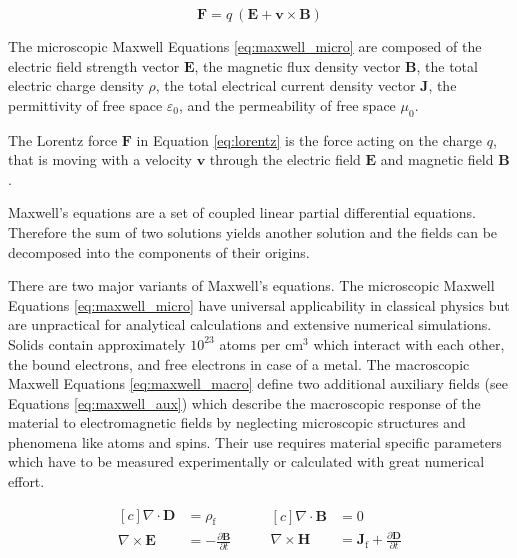 \begin{equation}
\label{eq:lorentz}
    \bm{F} = q\ (\bm{E} + \bm{v} \times \bm{B})
\end{equation}

The microscopic Maxwell Equations \ref{eq:maxwell_micro} are composed of the electric field strength vector $\bm{E}$, the magnetic flux density vector $\bm{B}$, the total electric charge density $\rho$, the total electrical current density vector $\bm{J}$, the permittivity of free space $\varepsilon_0$, and the permeability of free space $\mu_0$.

The Lorentz force $\bm{F}$ in Equation \ref{eq:lorentz} is the force acting on the charge $q$, that is moving with a velocity $\bm{v}$ through the electric field $\bm{E}$ and magnetic field $\bm{B}$.

Maxwell's equations are a set of coupled linear partial differential equations. Therefore the sum of two solutions yields another solution and the fields can be decomposed into the components of their origins.

There are two major variants of Maxwell's equations. The microscopic Maxwell Equations \ref{eq:maxwell_micro} have universal applicability in classical physics but are unpractical for analytical calculations and extensive numerical simulations. Solids contain approximately $10^{23}$ atoms per cm$^3$ which interact with each other, the bound electrons, and free electrons in case of a metal. The macroscopic Maxwell Equations \ref{eq:maxwell_macro} define two additional auxiliary fields (see Equations \ref{eq:maxwell_aux}) which describe the macroscopic response of the material to electromagnetic fields by neglecting microscopic structures and phenomena like atoms and spins. Their use requires material specific parameters which have to be measured experimentally or calculated with great numerical effort.\cite{demtroeder_mw}

\begin{equation}
\label{eq:maxwell_macro}
    \begin{aligned}[c]
        \nabla \cdot \bm{D} &= \rho_\text{f}\\
        \nabla \times \bm{E} &= -\frac{\partial \bm{B}}{\partial t}\\
    \end{aligned}
    \qquad
    \begin{aligned}[c]
        \nabla \cdot \bm{B} &= 0\\
        \nabla \times \bm{H} &= \bm{J}_\text{f} + \frac{\partial \bm{D}}{\partial t}\\
    \end{aligned}
\end{equation}

